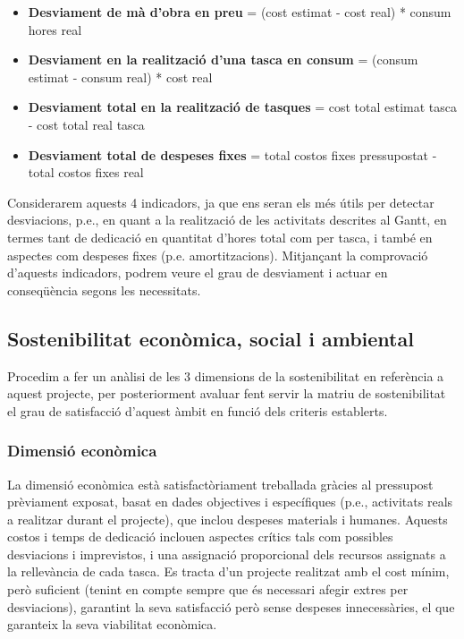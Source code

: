 \begin{itemize}
\item \textbf{Desviament de mà d’obra en preu} = (cost estimat - cost real) * consum hores real
\item \textbf{Desviament en la realització d’una tasca en consum} = (consum estimat - consum real) * cost real
\item \textbf{Desviament total en la realització de tasques} = cost total estimat tasca - cost total real tasca
\item \textbf{Desviament total de despeses fixes} = total costos fixes pressupostat - total costos fixes real
\end{itemize}

Considerarem aquests 4 indicadors, ja que ens seran els més útils per detectar desviacions, p.e., en quant a la realització de les activitats descrites al Gantt, en termes tant de dedicació en quantitat d’hores total com per tasca, i també en aspectes com despeses fixes (p.e. amortitzacions). Mitjançant la comprovació d’aquests indicadors, podrem veure el grau de desviament i actuar en conseqüència segons les necessitats. 

\subsection{Sostenibilitat econòmica, social i ambiental}

Procedim a fer un anàlisi de les 3 dimensions de la sostenibilitat en referència a aquest projecte, per posteriorment avaluar fent servir la matriu de sostenibilitat el grau de satisfacció d’aquest àmbit en funció dels criteris establerts.

\subsubsection{Dimensió econòmica}

La dimensió econòmica està satisfactòriament treballada gràcies al pressupost prèviament exposat, basat en dades objectives i específiques (p.e., activitats reals a realitzar durant el projecte), que inclou despeses materials i humanes. Aquests costos i temps de dedicació inclouen aspectes crítics tals com possibles desviacions i imprevistos, i una assignació proporcional dels recursos assignats a la rellevància de cada tasca. Es tracta d’un projecte realitzat amb el cost mínim, però suficient (tenint en compte sempre que és necessari afegir extres per desviacions), garantint la seva satisfacció però sense despeses innecessàries, el que garanteix la seva viabilitat econòmica.

